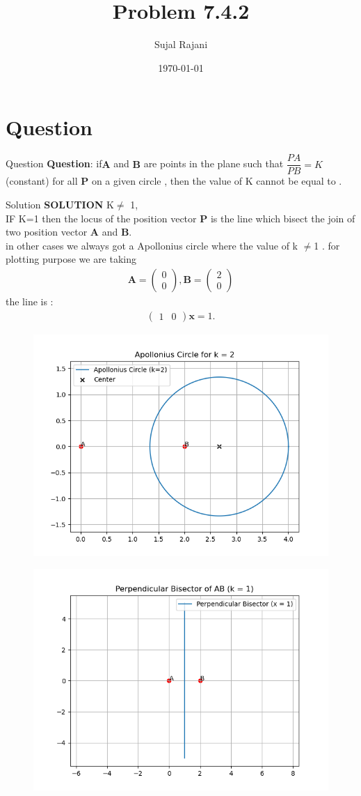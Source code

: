 \documentclass{beamer}
\title{Problem 7.4.2}
\author{Sujal Rajani}
\date{\today}
\let\vec\mathbf
\theoremstyle{remark}
\newcommand{\myvec}[1]{\ensuremath{\begin{pmatrix}#1\end{pmatrix}}}
\numberwithin{equation}{section}
\begin{document}
\begin{frame}
\titlepage
\end{frame}

\section{Question}
\begin{frame}{Question}
\textbf{Question}:
if$\vec{A}$ and $\vec{B}$ are points in the plane such that $\dfrac{PA}{PB}=K$(constant) for all $\vec{P}$ on a given circle , then the value of K cannot be equal to .
\end{frame}
\begin{frame}{Solution}
\textbf{SOLUTION}
 K$\neq$ 1,
 \\
 IF K=1 then the locus of the position vector $\vec{P}$ is the line which bisect the join of two position vector $\vec{A}$ and $\vec{B} $.
 \\
 in other cases we always got a Apollonius circle where the value of k $\neq $1 . 
 for plotting purpose we are taking 
 \begin{align*}
     \vec{A}=\myvec{0\\0}, \vec{B}=\myvec{2\\0}
 \end{align*}
  the line is :
 \begin{align*}
     \myvec{1&0}\vec{x}=1.
 \end{align*}
     \end{frame}
       \begin{frame}[fragile]
    \begin{figure}[H]
    \centering
    \includegraphics[width = 0.6\columnwidth]{../figs2/img.png}
    \caption*{}
    \label{figs}
\end{figure}
\end{frame}
\begin{frame}[fragile]
 \begin{figure}[H]
    \centering
    \includegraphics[width = 0.6\columnwidth]{../figs1/img.png}
    \caption*{}
    \label{figs}
\end{figure}
\end{frame}
\end{document}
